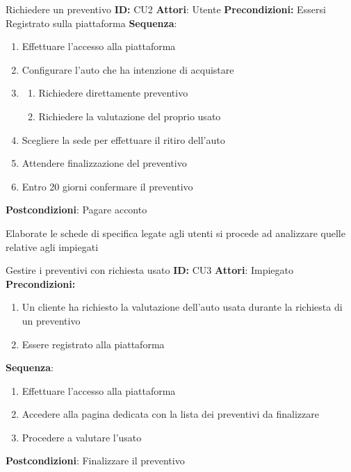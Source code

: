 \documentclass[a4paper, 11pt,oneside]{book}
\newcommand{\spacing}{\par\bigskip\noindent}
\begin{document}
        \begin{mybox}{Richiedere un preventivo}
            \textbf{ID:} CU2
            \tcbline
            \textbf{Attori}: Utente
            \tcbline
            \textbf{Precondizioni:} Essersi Registrato sulla piattaforma
            \tcbline
            \textbf{Sequenza}: 
            \begin{enumerate}
                \item Effettuare l'accesso alla piattaforma
                \item Configurare l'auto che ha intenzione di acquistare
                \item
                \begin{enumerate}
                    \item Richiedere direttamente preventivo
                    \item Richiedere la valutazione del proprio usato 
                \end{enumerate}
                \item Scegliere la sede per effettuare il ritiro dell'auto
                \item Attendere finalizzazione del preventivo
                \item Entro 20 giorni confermare il preventivo
            \end{enumerate}
            \tcbline
            \textbf{Postcondizioni}: Pagare acconto
        \end{mybox}
        \spacing
        Elaborate le schede di specifica legate agli utenti si procede ad analizzare quelle relative agli impiegati
        \begin{mybox}{Gestire i preventivi con richiesta usato}
            \textbf{ID:} CU3
            \tcbline
            \textbf{Attori}: Impiegato
            \tcbline
            \textbf{Precondizioni:} \begin{enumerate}
                \item Un cliente ha richiesto la valutazione dell'auto usata durante la richiesta di un preventivo
                \item Essere registrato alla piattaforma
                \tcbline
            \end{enumerate} 
            \textbf{Sequenza}: 
            \begin{enumerate}
                \item Effettuare l'accesso alla piattaforma
                \item Accedere alla pagina dedicata con la lista dei preventivi da finalizzare
                \item Procedere a valutare l'usato
            \end{enumerate}
            \tcbline
            \textbf{Postcondizioni}: Finalizzare il preventivo
        \end{mybox}
\end{document}
